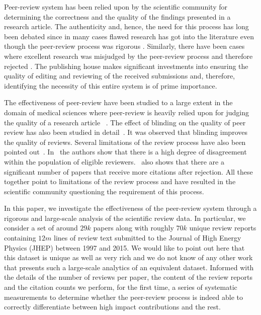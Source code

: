 \noindent

Peer-review system has been relied upon by the scientific community for determining the correctness and the quality of the findings presented in a research article. The authenticity and, hence, the need for this process has long been debated since in many cases flawed research has got into the literature even though the peer-review process was rigorous \cite{bohannon2013s}. Similarly, there have been cases where excellent research was misjudged by the peer-review process and therefore rejected \cite{braatz2014papers}. The publishing house makes significant investments into ensuring the quality of editing and reviewing of the received submissions and, therefore, identifying the necessity of this entire system is of prime importance. 


The effectiveness of peer-review have been studied to a large extent in the domain of medical sciences where peer-review is heavily relied upon for judging the quality of a research article ~\cite{jefferson2006editorial,kassirer1994peer,
rennie1990editorial}. The effect of blinding on the quality of peer review has also been studied in detail~\cite{jefferson2002measuring, mcnutt1990effects}. It was observed that blinding improves the quality of reviews. Several limitations of the review process have also been pointed out~\cite{horrobin1990philosophical}. In~\cite{cole1981chance} the authors show that there is a high degree of disagreement within the population of eligible reviewers.~\cite{braatz2014papers} also shows that there are a significant number of papers that receive more citations after rejection. All these together point to limitations of the review process and have resulted in the scientific community questioning the requirement of this process. 

 In this paper, we investigate the effectiveness of the peer-review system through a rigorous and large-scale analysis of the scientific review data. In particular, we consider a set of around $29k$ papers along with roughly $70k$ unique review reports containing $12m$ lines of review text submitted to the Journal of High Energy Physics (JHEP) between 1997 and 2015. We would like to point out here that this dataset is unique as well as very rich and we do not know of any other work that presents such a large-scale analytics of an equivalent dataset. Informed with the details of the number of reviews per paper, the content of the review reports and the citation counts we perform, for the first time, a series of systematic measurements to determine whether the peer-review process is indeed able to correctly differentiate between high impact contributions and the rest.


